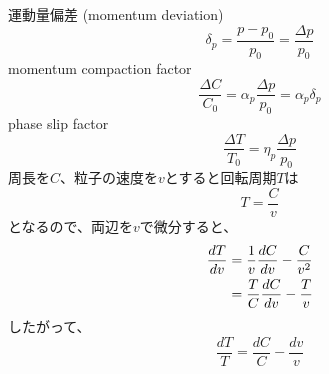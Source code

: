 \documentclass[10pt,a4paper]{ltjsarticle}
\begin{document}
運動量偏差 (momentum deviation)
\begin{equation}
    \delta_p = \frac{p-p_0}{p_0}=\frac{\Delta p}{p_0}
\end{equation}
%
momentum compaction factor
%
\begin{equation}
    \frac{\Delta C}{C_0}=\alpha_p\frac{\Delta p}{p_0}=\alpha_p\delta_p
\end{equation}
%
phase slip factor
\begin{equation}
    \frac{\Delta T}{T_0}=\eta_p\frac{\Delta p}{p_0}
\end{equation}
%
周長を$C$、粒子の速度を$v$とすると回転周期$T$は
%
\begin{equation}
    T=\frac{C}{v}
\end{equation}
%
となるので、両辺を$v$で微分すると、
%
\begin{align}
    \frac{dT}{dv} &= \frac{1}{v}\frac{dC}{dv}-\frac{C}{v^2} \notag \\
    & = \frac{T}{C}\frac{dC}{dv} - \frac{T}{v}
\end{align}
%
したがって、
%
\begin{equation}
    \frac{dT}{T} = \frac{dC}{C} - \frac{dv}{v}
\end{equation}
%
\end{document}
